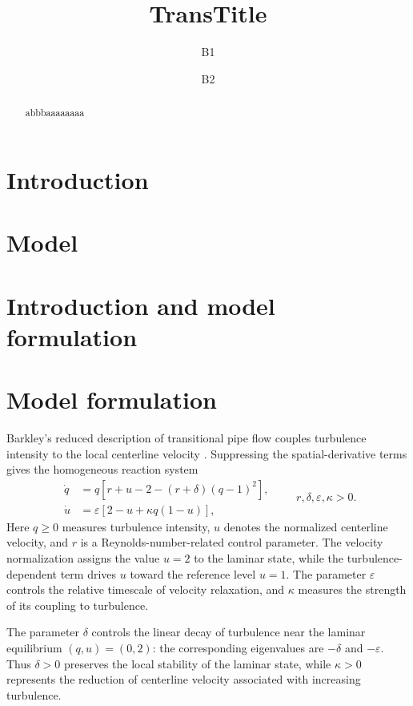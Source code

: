 \documentclass[11pt,reqno]{amsart}
\title[T]{TransTitle}
\author[A1]{B1}
\author[A2]{B2}
\theoremstyle{plain}
\theoremstyle{definition}
\theoremstyle{remark}
\begin{document}
\maketitle


\begin{abstract}
abbbaaaaaaaa
\end{abstract}

\section{Introduction}
\label{sec:intro}


\section{Model}
\label{sec:model}

\section{Introduction and model formulation}
\label{sec:introduction}

\section{Model formulation}
\label{sec:model}

Barkley's reduced description of transitional pipe flow couples
turbulence intensity to the local centerline velocity
\cite{barkley2011simplifying,barkley2015rise,barkley2016theoretical}.
Suppressing the spatial-derivative terms gives the homogeneous
reaction system
\begin{equation}
\begin{aligned}
\dot q
&=q\left[r+u-2-(r+\delta)(q-1)^2\right],\\
\dot u
&=\varepsilon\left[2-u+\kappa q(1-u)\right],
\end{aligned}
\qquad
r,\delta,\varepsilon,\kappa>0.
\label{eq:barkley-general}
\end{equation}
Here $q\geq0$ measures turbulence intensity, $u$ denotes the
normalized centerline velocity, and $r$ is a Reynolds-number-related
control parameter. The velocity normalization assigns the value
$u=2$ to the laminar state, while the turbulence-dependent term
drives $u$ toward the reference level $u=1$.
The parameter $\varepsilon$ controls the relative timescale of
velocity relaxation, and $\kappa$ measures the strength of its
coupling to turbulence.

The parameter $\delta$ controls the linear decay of turbulence
near the laminar equilibrium $(q,u)=(0,2)$: the corresponding
eigenvalues are $-\delta$ and $-\varepsilon$. Thus $\delta>0$
preserves the local stability of the laminar state, while
$\kappa>0$ represents the reduction of centerline velocity
associated with increasing turbulence.
\end{document}
